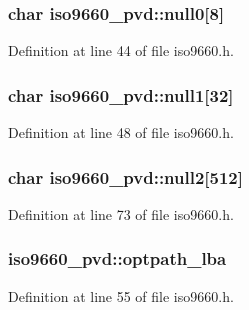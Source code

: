 \hypertarget{structiso9660__pvd_a78ee633ab6f48084aa516c057b174b2b}{
\subsubsection[{null0}]{\setlength{\rightskip}{0pt plus 5cm}char iso9660\+\_\+pvd\+::null0\mbox{[}8\mbox{]}}}\label{structiso9660__pvd_a78ee633ab6f48084aa516c057b174b2b}


Definition at line 44 of file iso9660.\+h.

\hypertarget{structiso9660__pvd_acd09bfa075780a123c973b0b0771f90e}{
\subsubsection[{null1}]{\setlength{\rightskip}{0pt plus 5cm}char iso9660\+\_\+pvd\+::null1\mbox{[}32\mbox{]}}}\label{structiso9660__pvd_acd09bfa075780a123c973b0b0771f90e}


Definition at line 48 of file iso9660.\+h.

\hypertarget{structiso9660__pvd_a3fe9fe9cbdc559e8ccc9029f33e24899}{
\subsubsection[{null2}]{\setlength{\rightskip}{0pt plus 5cm}char iso9660\+\_\+pvd\+::null2\mbox{[}512\mbox{]}}}\label{structiso9660__pvd_a3fe9fe9cbdc559e8ccc9029f33e24899}


Definition at line 73 of file iso9660.\+h.

\hypertarget{structiso9660__pvd_a3cc29bf3f73bf3fbd6b3ed28f5698b15}{
\subsubsection[{optpath\+\_\+lba}]{ iso9660\+\_\+pvd\+::optpath\+\_\+lba}}\label{structiso9660__pvd_a3cc29bf3f73bf3fbd6b3ed28f5698b15}


Definition at line 55 of file iso9660.\+h.

